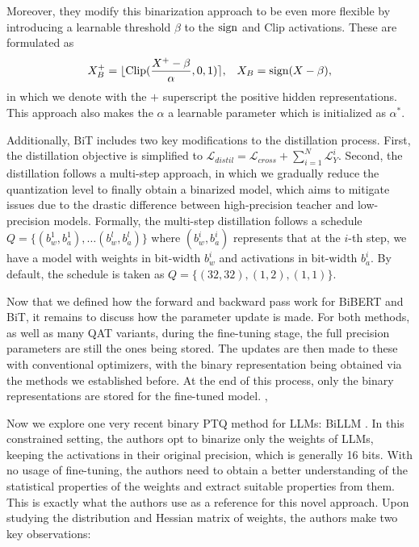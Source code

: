 Moreover, they modify this binarization approach to be even more flexible by introducing a learnable threshold $\beta$ to the $\text{sign}$ and $\text{Clip}$ activations. These are formulated as
\begin{equation}
    X_B^+ = \lfloor \text{Clip}( \frac{X^+ - \beta}{\alpha}, 0, 1) \rceil, \;\;\; X_B = \text{sign}(X - \beta),
\end{equation}
in which we denote with the $+$ superscript the positive hidden representations. This approach also makes the $\alpha$ a learnable parameter which is initialized as $\alpha^*$.

Additionally, BiT includes two key modifications to the distillation process. First, the distillation objective is simplified to $\mathcal{L}_{distil} = \mathcal{L}_{cross} + \sum_{i=1}^N \mathcal{L}^i_{Y}$. Second, the distillation follows a multi-step approach, in which we gradually reduce the quantization level to finally obtain a binarized model, which aims to mitigate issues due to the drastic difference between high-precision teacher and low-precision models. Formally, the multi-step distillation follows a schedule $Q = \{ (b^1_w, b_a^1), \ldots (b^l_w, b^l_a) \}$ where $(b^i_w, b^i_a)$ represents that at the $i$-th step, we have a model with weights in bit-width $b^i_w$ and activations in bit-width $b^i_a$. By default, the schedule is taken as $Q = \{(32, 32), (1, 2), (1, 1)\}$.

\vspace{1em}

Now that we defined how the forward and backward pass work for BiBERT and BiT, it remains to discuss how the parameter update is made. For both methods, as well as many QAT variants, during the fine-tuning stage, the full precision parameters are still the ones being stored. The updates are then made to these with conventional optimizers, with the binary representation being obtained via the methods we established before. At the end of this process, only the binary representations are stored for the fine-tuned model. ,


\vspace{1em}

Now we explore one very recent binary PTQ method for LLMs: BiLLM \cite{huang2024billm}. In this constrained setting, the authors opt to binarize only the weights of LLMs, keeping the activations in their original precision, which is generally 16 bits.
With no usage of fine-tuning, the authors need to obtain a better understanding of the statistical properties of the weights and extract suitable properties from them. 
This is exactly what the authors use as a reference for this novel approach. Upon studying the distribution and Hessian matrix of weights, the authors make two key observations: 

